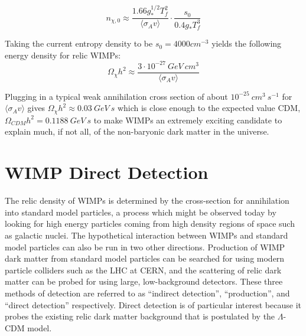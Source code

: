\begin{equation}
n_{\chi,0} 
\approx
\frac{1.66 g_{*}^{1/2}T_{f}^{2}}{\langle \sigma_{A}v \rangle }
\cdot
\frac{s_{0}}{0.4 g_{*}T_{f}^{3}}
\end{equation} 

Taking the current entropy density to be $s_{0}=4000 cm^{-3}$ yields the following energy density for relic WIMPs:
\begin{equation}
\Omega_{\chi} h^{2}
\approx
\frac{3 \cdot 10^{-27} \ GeV \ cm^{3}}{\langle \sigma_{A}v \rangle}
\end{equation}

Plugging in a typical weak annihilation cross section of about $10^{-25} \ cm^{3} \ s^{-1}$ for $\langle \sigma_{A}v \rangle$ gives $\Omega_{\chi} h^{2} \approx 0.03 \ GeV \ s$ which is close enough to the expected value CDM, $\Omega_{CDM} h^{2} = 0.1188 \ GeV \ s$\cite{planck2015} to make WIMPs an extremely exciting candidate to explain much, if not all, of the non-baryonic dark matter in the universe\cite{susyDM,wimp2}.


\section{WIMP Direct Detection}
The relic density of WIMPs is determined by the cross-section for annihilation into standard model particles, a process which might be observed today by looking for high energy particles coming from high density regions of space such as galactic nuclei. The hypothetical interaction between WIMPs and standard model particles can also be run in two other directions. Production of WIMP dark matter from standard model particles can be searched for using modern particle colliders such as the LHC at CERN, and the scattering of relic dark matter can be probed for using large, low-background detectors. These three methods of detection are referred to as ``indirect detection'', ``production'', and ``direct detection'' respectively. Direct detection is of particular interest because it probes the existing relic dark matter background that is postulated by the $\Lambda$-CDM model.

